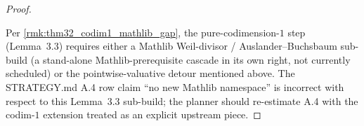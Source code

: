 \begin{proof}
\begin{itemize}
  \end{itemize}
  Per \cref{rmk:thm32_codim1_mathlib_gap}, the pure-codimension-\(1\) step (Lemma~3.3) requires either a Mathlib Weil-divisor / Auslander--Buchsbaum sub-build (a stand-alone Mathlib-prerequisite cascade in its own right, not currently scheduled) or the pointwise-valuative detour mentioned above. The STRATEGY.md A.4 row claim ``no new Mathlib namespace'' is incorrect with respect to this Lemma~3.3 sub-build; the planner should re-estimate A.4 with the codim-\(1\) extension treated as an explicit upstream piece.
\end{proof}
